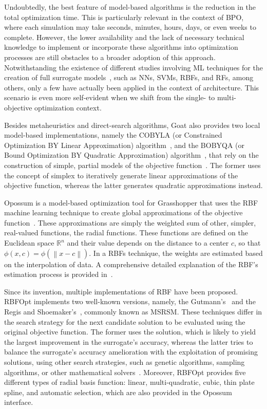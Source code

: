	Undoubtedly, the best feature of model-based algorithms is the reduction in the total optimization time. This is particularly relevant in the context of \ac{BPO}, where each simulation may take seconds, minutes, hours, days, or even weeks to complete. However, the lower availability and the lack of necessary technical knowledge to implement or incorporate these algorithms into optimization processes are still obstacles to a broader adoption of this approach. Notwithstanding the existence of different studies involving \ac{ML} techniques for the creation of full surrogate models~\cite{Koziel2011, Forrester2009SBO}, such as \acp{NN}, \acp{SVM}, \acp{RBF}, and \acp{RF}, among others, only a few have actually been applied in the context of architecture. This scenario is even more self-evident when we shift from the single- to multi-objective optimization context.
	
	Besides metaheuristics and direct-search algorithms, Goat also provides two local model-based implementations, namely the COBYLA (or Constrained Optimization BY Linear Approximation) algorithm~\cite{Powell1994COBYLA}, and the BOBYQA (or Bound Optimization BY Quadratic Approximation) algorithm~\cite{Powell2009BOBYQA}, that rely on the construction of simple, partial models of the objective function~\cite{Koziel2011}. The former uses the concept of simplex to iteratively generate linear approximations of the objective function, whereas the latter generates quadratic approximations instead. 
	
	Opossum is a model-based optimization tool for Grasshopper that uses the \ac{RBF} machine learning technique to create global approximations of the objective function~\cite{Forrester2009SBO}. These approximations are simply the weighted sum of other, simpler, real-valued functions, the radial functions. These functions are defined on the Euclidean space $\mathbb{R}^n$ and their value depends on the distance to a center $c$, so that $\phi(x, c) = \phi(\left\lVert x-c \right\rVert)$. In a \acp{RBF} technique, the weights are estimated based on the interpolation of data. A comprehensive detailed explanation of the \ac{RBF}'s estimation process is provided in~\cite{Forrester2009SBO}. 
	
	Since its invention, multiple implementations of \ac{RBF} have been proposed. RBFOpt implements two well-known versions, namely, the Gutmann's~\cite{Gutmann2001} and the Regis and Shoemaker's~\cite{Regis2007}, commonly known as MSRSM. These techniques differ in the search strategy for the next candidate solution to be evaluated using the original objective function. The former uses the solution, which is likely to yield the largest improvement in the surrogate's accuracy, whereas the latter tries to balance the surrogate's accuracy amelioration with the exploitation of promising solutions, using other search strategies, such as genetic algorithms, sampling algorithms, or other mathematical solvers~\cite{Wortmann2017Opossum}. Moreover, RBFOpt provides five different types of radial basis function: linear, multi-quadratic, cubic, thin plate spline, and automatic selection, which are also provided in the Opossum interface.
	
